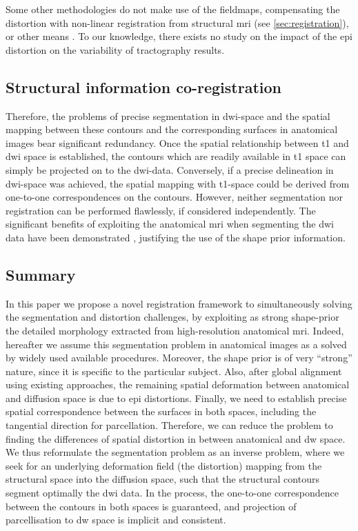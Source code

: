 Some other methodologies do not make use of the fieldmaps, compensating the 
distortion with non-linear registration from structural \gls{mri} 
\citep{kybic_unwarping_2000} (see \autoref{sec:registration}), or other means 
\citep{andersson_modeling_2001}. To our knowledge, there exists no study on 
the impact of the \gls{epi} distortion on the variability of tractography 
results. 


\subsection{Structural information co-registration}
\label{sec:registration}

Therefore, the problems of precise segmentation in \gls{dwi}-space and the 
spatial mapping between these contours and the corresponding surfaces in 
anatomical images bear significant redundancy. Once the spatial relationship 
between \gls{t1} and \gls{dwi} space is established, the contours which are 
readily available in \gls{t1} space can simply be projected on to the 
\gls{dwi}-data. Conversely, if a precise delineation in \gls{dwi}-space 
was achieved, the spatial mapping with \gls{t1}-space could be derived 
from one-to-one correspondences on the contours. However, neither segmentation 
nor registration can be performed flawlessly, if considered independently. 
The significant benefits of exploiting the anatomical \gls{mri} when 
segmenting the \gls{dwi} data have been demonstrated \cite{zollei_improved_2010}, 
justifying the use of the shape prior information. 

\subsection{Summary}
\label{sec:contributions}

In this paper we propose a novel registration framework to simultaneously
solving the segmentation and distortion challenges, by exploiting as strong 
shape-prior the detailed morphology extracted from high-resolution anatomical 
\gls{mri}. Indeed, hereafter we assume this segmentation problem in anatomical 
images as a solved by widely used available procedures.
Moreover, the shape prior is of very ``strong'' nature, since it is specific to 
the particular subject. Also, after global alignment using existing approaches, 
the remaining spatial deformation between anatomical and diffusion space is 
due to \gls{epi} distortions. Finally, we need to establish precise spatial 
correspondence between the surfaces in both spaces, including the tangential 
direction for parcellation. Therefore, we can reduce the problem to finding 
the differences of spatial distortion in between anatomical and \gls{dw} space.
We thus reformulate the segmentation problem as an inverse problem, where we 
seek for an underlying deformation field (the distortion) mapping 
from the structural space into the diffusion space, such that the structural 
contours segment optimally the \gls{dwi} data. In the process, the one-to-one 
correspondence between the contours in both spaces is guaranteed, and projection 
of parcellisation to \gls{dw} space is implicit and consistent.

